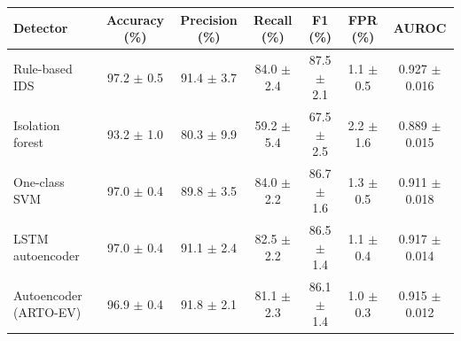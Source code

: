 \begin{tabular}{@{}lcccccc@{}}
\toprule
Detector & Accuracy (\%) & Precision (\%) & Recall (\%) & F1 (\%) & FPR (\%) & AUROC \\
\midrule
Rule-based IDS & 97.2 $\pm$ 0.5 & 91.4 $\pm$ 3.7 & 84.0 $\pm$ 2.4 & 87.5 $\pm$ 2.1 & 1.1 $\pm$ 0.5 & 0.927 $\pm$ 0.016 \\
Isolation forest & 93.2 $\pm$ 1.0 & 80.3 $\pm$ 9.9 & 59.2 $\pm$ 5.4 & 67.5 $\pm$ 2.5 & 2.2 $\pm$ 1.6 & 0.889 $\pm$ 0.015 \\
One-class SVM & 97.0 $\pm$ 0.4 & 89.8 $\pm$ 3.5 & 84.0 $\pm$ 2.2 & 86.7 $\pm$ 1.6 & 1.3 $\pm$ 0.5 & 0.911 $\pm$ 0.018 \\
LSTM autoencoder & 97.0 $\pm$ 0.4 & 91.1 $\pm$ 2.4 & 82.5 $\pm$ 2.2 & 86.5 $\pm$ 1.4 & 1.1 $\pm$ 0.4 & 0.917 $\pm$ 0.014 \\
Autoencoder (ARTO-EV) & 96.9 $\pm$ 0.4 & 91.8 $\pm$ 2.1 & 81.1 $\pm$ 2.3 & 86.1 $\pm$ 1.4 & 1.0 $\pm$ 0.3 & 0.915 $\pm$ 0.012 \\
\bottomrule
\end{tabular}